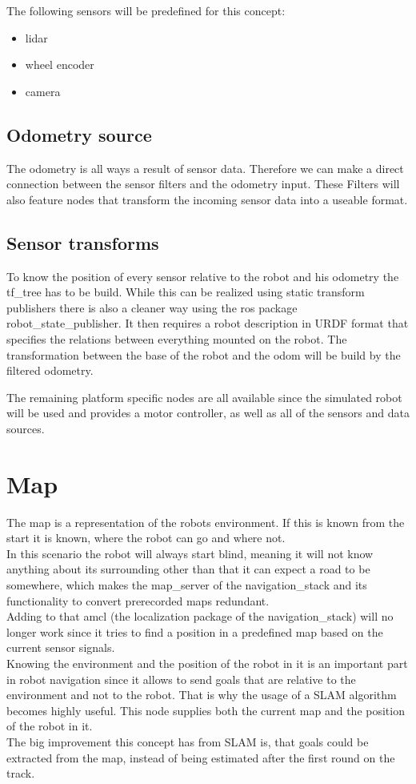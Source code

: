 The following sensors will be predefined for this concept:

\begin{itemize}
	\item lidar
	\item wheel encoder
	\item camera
\end{itemize}


\subsection{Odometry source}
The odometry is all ways a result of sensor data. Therefore we can make a direct connection between the sensor filters and the odometry input. These Filters will also feature nodes that transform the incoming sensor data into a useable format.

\subsection{Sensor transforms}
To know the position of every sensor relative to the robot and his odometry the tf\_tree has to be build. While this can be realized using static transform publishers there is also a cleaner way using the ros package robot\_state\_publisher. It then requires a robot description in URDF format that specifies the relations between everything mounted on the robot.
The transformation between the base of the robot and the odom will be build by the filtered odometry.

The remaining platform specific nodes are all available since the simulated robot will be used and provides a motor controller, as well as all of the sensors and data sources.

\section{Map}

The map is a representation of the robots environment. If this is known from the start it is known, where the robot can go and where not.\\
 In this scenario the robot will always start blind, meaning it will not know anything about its surrounding other than that it can expect a road to be somewhere, which makes the map\_server of the navigation\_stack and its functionality to convert prerecorded maps redundant.\\
Adding to that amcl (the localization package of the navigation\_stack) will no longer work since it tries to find a position in a predefined map based on the current sensor signals.\\
Knowing the environment and the position of the robot in it is an important part in robot navigation since it allows to send goals that are relative to the environment and not to the robot. That is why the usage of a SLAM algorithm becomes highly useful. This node supplies both the current map and the position of the robot in it.\\
The big improvement this concept has from SLAM is, that goals could be extracted from the map, instead of being estimated after the first round on the track.

